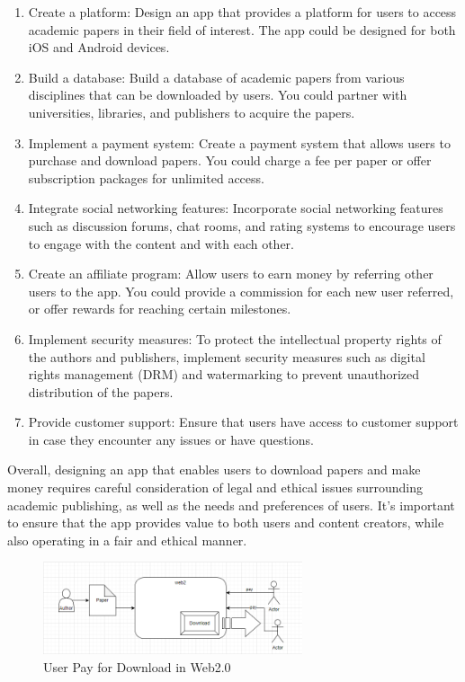 \documentclass[lettersize,journal]{IEEEtran}
\begin{document}
\begin{enumerate}
  \item {Create a platform: Design an app that provides a platform for users to access academic papers in their field of interest. The app could be designed for both iOS and Android devices.}
  \item {Build a database: Build a database of academic papers from various disciplines that can be downloaded by users. You could partner with universities, libraries, and publishers to acquire the papers.}
  \item {Implement a payment system: Create a payment system that allows users to purchase and download papers. You could charge a fee per paper or offer subscription packages for unlimited access.}
  \item {Integrate social networking features: Incorporate social networking features such as discussion forums, chat rooms, and rating systems to encourage users to engage with the content and with each other.}
  \item {Create an affiliate program: Allow users to earn money by referring other users to the app. You could provide a commission for each new user referred, or offer rewards for reaching certain milestones.}
  \item {Implement security measures: To protect the intellectual property rights of the authors and publishers, implement security measures such as digital rights management (DRM) and watermarking to prevent unauthorized distribution of the papers.}
  \item {Provide customer support: Ensure that users have access to customer support in case they encounter any issues or have questions. }
\end{enumerate}


Overall, designing an app that enables users to download papers and make money requires careful consideration of legal and ethical issues surrounding academic publishing, as well as the needs and preferences of users. It's important to ensure that the app provides value to both users and content creators, while also operating in a fair and ethical manner.

\begin{figure}[h]
  \includegraphics[width=3in]{assets/web2.png}
  \caption{User Pay for Download in Web2.0}
\end{figure}
\end{document}
